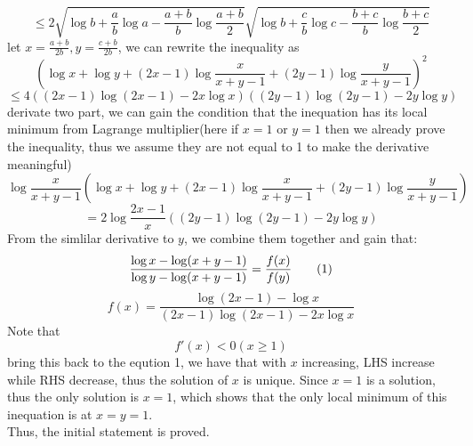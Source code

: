 \documentclass[a4 paper,12pt]{article}
\theoremstyle{definitionstyle}
\newcommand\numberthis{\addtocounter{equation}{1}\tag{\theequation}}
\begin{document}
\[
  \le 2\sqrt{\log b+\frac a b\log a-\frac{a+b} b\log\frac{a+b}{2}}\sqrt{\log b+\frac c b\log c-\frac{b+c} b\log\frac{b+c}{2}}
\]
let $x=\frac{a+b}{2b},y=\frac{c+b}{2b}$, we can rewrite the inequality as
\[
  \left(\log x+\log y+(2x-1)\log\frac{x}{x+y-1}+(2y-1)\log\frac{y}{x+y-1}\right)^2
\]
\[
  \le 4\left((2x-1)\log{(2x-1)}-2x\log x\right)\left((2y-1)\log{(2y-1)-2y\log y}\right)
\]
derivate two part, we can gain the condition that the inequation has its local minimum from Lagrange multiplier(here if $x=1$ or $y=1$ then we already prove the inequality, thus we assume they are not equal to 1 to make the derivative meaningful)
\[
  \log\frac{x}{x+y-1}\left(\log x+\log y+(2x-1)\log\frac{x}{x+y-1}+(2y-1)\log\frac{y}{x+y-1}\right)
\]
\[
  =2\log \frac{2x-1}x\left((2y-1)\log{(2y-1)-2y\log y}\right)
\]
From the simlilar derivative to $y$, we combine them together and gain that:
\[
  \frac {\log x-\log(x+y-1)}{\log y-\log(x+y-1)}=\frac{f(x)}{f(y)}\numberthis
\]
\[
  f(x)=\frac{\log(2x-1)-\log x}{(2x-1)\log(2x-1)-2x\log x}
\]
Note that 
\[
  f'(x)<0(x\ge 1)
\]
bring this back to the eqution 1, we have that with $x$ increasing, LHS increase while RHS decrease, thus the solution of $x$ is unique. Since $x=1$ is a solution, thus the only solution is $x=1$, which shows that the only local minimum of this inequation is at $x=y=1$.\\
Thus, the initial statement is proved.
\end{document}
